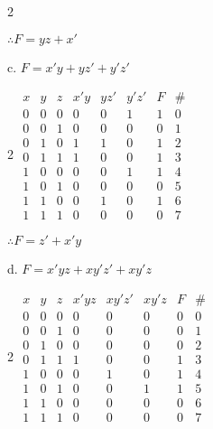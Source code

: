 \documentclass[12pt]{book}
\newenvironment{indented}[1] {
	\begin{list}{}{\setlength{\leftmargin}{#1}}
		\item[]
	}{\end{list}}
\begin{document}
\begin{indented}{5mm}
\begin{indented}{5mm}
\begin{multicols}{2}
				\begin{karnaugh-map}[4][2][1][yz][x]

				\end{karnaugh-map}
			\end{multicols}
			$\therefore F = yz + x'$			
		\end{indented}
		
		c. $F = x'y + yz' + y'z'$
		\begin{indented}{5mm}
			\begin{multicols}{2}
				$\begin{array}{c|c|c|c|c|c|c|c}
					x & y & z & x'y & yz' & y'z' & F & \#\\
					\hline
					0 & 0 & 0 & 0 & 0 & 1 & 1 & 0 \\
					0 & 0 & 1 & 0 & 0 & 0 & 0 & 1 \\
					0 & 1 & 0 & 1 & 1 & 0 & 1 & 2 \\
					0 & 1 & 1 & 1 & 0 & 0 & 1 & 3 \\
					1 & 0 & 0 & 0 & 0 & 1 & 1 & 4 \\
					1 & 0 & 1 & 0 & 0 & 0 & 0 & 5 \\
					1 & 1 & 0 & 0 & 1 & 0 & 1 & 6 \\
					1 & 1 & 1 & 0 & 0 & 0 & 0 & 7
				\end{array}$
				\columnbreak

				\begin{karnaugh-map}[4][2][1][yz][x]

				\end{karnaugh-map}
			\end{multicols}
			$\therefore F = z' + x'y$
		\end{indented}

		d. $F = x'yz + xy'z' + xy'z$
		\begin{indented}{5mm}
			\begin{multicols}{2}
				$\begin{array}{c|c|c|c|c|c|c|c}
					x & y & z & x'yz & xy'z' & xy'z & F & \#\\
					\hline
					0 & 0 & 0 & 0 & 0 & 0 & 0 & 0 \\
					0 & 0 & 1 & 0 & 0 & 0 & 0 & 1 \\
					0 & 1 & 0 & 0 & 0 & 0 & 0 & 2 \\
					0 & 1 & 1 & 1 & 0 & 0 & 1 & 3 \\
					1 & 0 & 0 & 0 & 1 & 0 & 1 & 4 \\
					1 & 0 & 1 & 0 & 0 & 1 & 1 & 5 \\
					1 & 1 & 0 & 0 & 0 & 0 & 0 & 6 \\
					1 & 1 & 1 & 0 & 0 & 0 & 0 & 7
				\end{array}$
				\columnbreak


\end{multicols}
\end{indented}
\end{indented}
\end{document}
